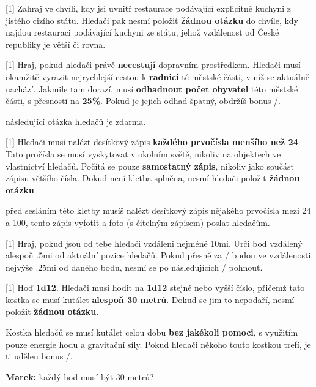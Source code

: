 \begin{cards}

	 Zahraj ve chvíli, kdy jsi uvnitř restaurace podávající explicitně kuchyni z jistého cizího státu. Hledači pak nesmí položit \textbf{žádnou otázku} do chvíle, kdy najdou restauraci podávající kuchyni ze státu, jehož vzdálenost od České republiky je větší či rovna.

	 Hraj, pokud hledači právě \textbf{necestují} dopravním prostředkem. Hledači musí okamžitě vyrazit nejrychlejší cestou k \textbf{radnici} té městské části, v níž se aktuálně nachází. Jakmile tam dorazí, musí \textbf{odhadnout počet obyvatel} této městské části, s přesností na \textbf{25\%}. Pokud je jejich odhad špatný, obdržíš bonus \timecursecensustaker/.

	\cost následující otázka hledačů je zdarma.

	 Hledači musí nalézt desítkový zápis \textbf{každého prvočísla menšího než 24}. Tato pročísla se musí vyskytovat v okolním světě, nikoliv na objektech ve vlastnictví hledačů. Počítá se pouze \textbf{samostatný zápis}, nikoliv jako součást zápisu většího čísla. Dokud není kletba splněna, nesmí hledači položit \textbf{žádnou otázku}.

	\cost před sesláním této kletby musíš nalézt desítkový zápis nějakého prvočísla mezi 24 a 100, tento zápis vyfotit a foto (s čitelným zápisem) poslat hledačům.

	 Hraj, pokud jsou od tebe hledači vzdáleni nejméně \dist10mi. Urči bod vzdálený alespoň \dist.5mi od aktuální pozice hledačů. Pokud přesně za \timecursedotcountdown/ budou ve vzdálenosti nejvýše \dist.25mi od daného bodu, nesmí se po následujících \timecursedotfreeze/ pohnout.

	 Hoď \textbf{1d12}. Hledači musí hodit na \textbf{1d12} stejné nebo vyšší číslo, přičemž tato kostka se musí kutálet \textbf{alespoň 30 metrů}. Dokud se jim to nepodaří, nesmí položit \textbf{žádnou otázku}.

	Kostka hledačů se musí kutálet celou dobu \textbf{bez jakékoli pomoci}, s využitím pouze energie hodu a gravitační síly. Pokud hledači někoho touto kostkou trefí, je ti udělen bonus \timecursetumblehit/.

	\begin{reasoning}
		\textbf{Marek:} každý hod musí být 30 metrů?


\end{reasoning}
\end{cards}
